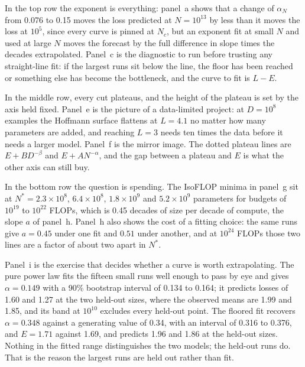 In the top row the exponent is everything: panel~a shows that a change of
$\alpha_N$ from 0.076 to 0.15 moves the loss predicted at $N = 10^{13}$ by less
than it moves the loss at $10^5$, since every curve is pinned at $N_c$, but an
exponent fit at small $N$ and used at large $N$ moves the forecast by the full
difference in slope times the decades extrapolated. Panel~c is the diagnostic to
run before trusting any straight-line fit: if the largest runs sit below the line,
the floor has been reached or something else has become the bottleneck, and the
curve to fit is $L - E$.

In the middle row, every cut plateaus, and the height of the plateau is set by the
axis held fixed. Panel~e is the picture of a data-limited project: at
$D = 10^8$ examples the Hoffmann surface flattens at $L = 4.1$ no matter how many
parameters are added, and reaching $L = 3$ needs ten times the data before it
needs a larger model. Panel~f is the mirror image. The dotted plateau lines are
$E + BD^{-\beta}$ and $E + AN^{-\alpha}$, and the gap between a plateau and $E$ is
what the other axis can still buy.

In the bottom row the question is spending. The IsoFLOP minima in panel~g sit at
$N^* = 2.3\times10^8$, $6.4\times10^8$, $1.8\times10^9$ and $5.2\times10^9$
parameters for budgets of $10^{19}$ to $10^{22}$ FLOPs, which is 0.45 decades of
size per decade of compute, the slope $a$ of panel~h. Panel~h also shows the cost
of a fitting choice: the same runs give $a = 0.45$ under one fit and $0.51$ under
another, and at $10^{24}$ FLOPs those two lines are a factor of about two apart
in $N^*$.

Panel~i is the exercise that decides whether a curve is worth extrapolating. The
pure power law fits the fifteen small runs well enough to pass by eye and gives
$\alpha = 0.149$ with a 90\% bootstrap interval of 0.134 to 0.164; it predicts
losses of 1.60 and 1.27 at the two held-out sizes, where the observed means are
1.99 and 1.85, and its band at $10^{10}$ excludes every held-out point. The floored
fit recovers $\alpha = 0.348$ against a generating value of 0.34, with an interval
of 0.316 to 0.376, and $E = 1.71$ against 1.69, and predicts 1.96 and 1.86 at the
held-out sizes. Nothing in the fitted range distinguishes the two models; the
held-out runs do. That is the reason the largest runs are held out rather than
fit.

